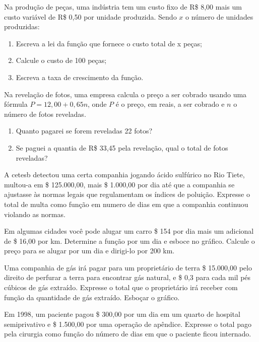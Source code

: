 	\item Na produção de peças, uma indústria tem um custo fixo de R\$ 8,00 mais um custo variável de R\$ 0,50 por unidade produzida. Sendo $x$ o número de unidades produzidas:
	\begin{enumerate}
		\item Escreva a lei da função que fornece o custo total de x peças;
		\item Calcule o custo de 100 peças;
		\item Escreva a taxa de crescimento da função.
	\end{enumerate}
	\item Na revelação de fotos, uma empresa calcula o preço a ser cobrado usando uma fórmula $P=12,00 + 0,65n$, onde $P$ é o preço, em reais, a ser cobrado e $n$ o número de fotos reveladas.
	\begin{enumerate}
		\item Quanto pagarei se forem reveladas 22 fotos?
		\item Se paguei a quantia de R\$ 33,45 pela revelação, qual o total de fotos reveladas?
	\end{enumerate}
		 		\item A cetesb detectou uma certa companhia jogando ácido sulfúrico no Rio Tiete, multou-a em \$ 125.000,00, mais \$ 1.000,00 por dia até que a companhia se ajustasse às normas legais que regulamentam os índices de poluição. Expresse o total de multa como função em numero de dias em que a companhia continuou violando as normas. 
		 		
		 		\item Em algumas cidades você pode alugar um carro \$ 154 por dia mais um adicional de \$ 16,00 por km. Determine a função por um dia e esboce no gráfico. Calcule o preço para se alugar por um dia e dirigi-lo por 200 km.
		 		
		 		\item Uma companhia de gás irá pagar para um proprietário de terra \$ 15.000,00 pelo direito de perfurar a terra para encontrar gás natural, e \$ 0,3 para cada mil pés cúbicos de gás
extraído. Expresse o total que o proprietário irá receber com função da quantidade de gás
extraído. Esboçar o gráfico.

				\item Em 1998, um paciente pagou \$ 300,00 por um dia em um quarto de hospital semiprivativo e \$ 1.500,00 por uma operação de apêndice. Expresse o total pago pela cirurgia como função do número de dias em que o paciente ficou internado.

